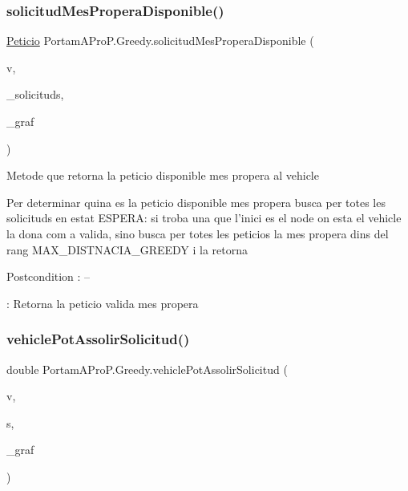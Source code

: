 \subsubsection{\texorpdfstring{solicitud\+Mes\+Propera\+Disponible()}{solicitudMesProperaDisponible()}}
{\footnotesize\ttfamily \hyperlink{class_portam_a_pro_p_1_1_peticio}{Peticio} Portam\+A\+Pro\+P.\+Greedy.\+solicitud\+Mes\+Propera\+Disponible (\begin{DoxyParamCaption}\item[{\hyperlink{class_portam_a_pro_p_1_1_vehicle}{Vehicle}}]{v,  }\item[{Sorted\+Set$<$ \hyperlink{class_portam_a_pro_p_1_1_peticio}{Peticio} $>$}]{\+\_\+solicituds,  }\item[{Graph}]{\+\_\+graf }\end{DoxyParamCaption})}

Metode que retorna la peticio disponible mes propera al vehicle \begin{DoxyVerb}  Per determinar quina es la peticio disponible mes propera busca per totes les solicituds en estat ESPERA:
  si troba una que l'inici es el node on esta el vehicle la dona com a valida, 
  sino busca per totes les peticios la mes propera dins del rang MAX_DISTNACIA_GREEDY
  i la retorna
\end{DoxyVerb}


\begin{DoxyPostcond}{Postcondition}
\+: -- 

\+: Retorna la peticio valida mes propera 
\end{DoxyPostcond}
\mbox{\label{class_portam_a_pro_p_1_1_greedy_ab5ac383d579ef9227ca99e52075e893d}} 
\subsubsection{\texorpdfstring{vehicle\+Pot\+Assolir\+Solicitud()}{vehiclePotAssolirSolicitud()}}
{\footnotesize\ttfamily double Portam\+A\+Pro\+P.\+Greedy.\+vehicle\+Pot\+Assolir\+Solicitud (\begin{DoxyParamCaption}\item[{\hyperlink{class_portam_a_pro_p_1_1_vehicle}{Vehicle}}]{v,  }\item[{\hyperlink{class_portam_a_pro_p_1_1_peticio}{Peticio}}]{s,  }\item[{Graph}]{\+\_\+graf }\end{DoxyParamCaption})}



